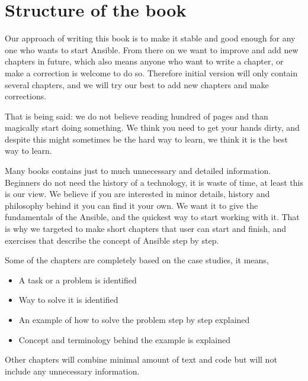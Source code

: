 \documentclass[10pt]{book}
\begin{document}
\section*{Structure of the book}
Our approach of writing this book is to make it stable and good enough for any 
one who wants to start Ansible. From there on we want to improve and add new chapters in future, 
which also means anyone who want to write a chapter, or make a correction is welcome to do 
so. Therefore initial version will only contain several chapters, and we will 
try our best to add new chapters and make corrections.

That is being said: we do not believe reading hundred of pages and than magically start doing 
something. We think you need to get your hands dirty, and despite this might sometimes 
be the hard way to learn, we think it is the best way to learn.

Many books contains just to much unnecessary and detailed information. Beginners 
do not need the history of a technology, it is waste of time, at least this is our view. 
We believe if you are interested in minor details, history and philosophy behind 
it you can find it your own.
We want it to give the fundamentals of the Ansible, and the quickest way to 
start working with it. That is why we targeted to make short chapters that user can start and finish, 
and exercises that describe the concept of Ansible step by step.

Some of the chapters are completely based on the case studies, it means, 

\begin{itemize}
\item A task or a problem is identified 
\item Way to solve it is identified
\item An example of how to solve the problem step by step explained
\item Concept and terminology behind the example is explained
\end{itemize}

Other chapters will combine minimal amount of text and code but will not include 
any unnecessary information.

\normalsize
\clearemptydoublepage



\end{document}
